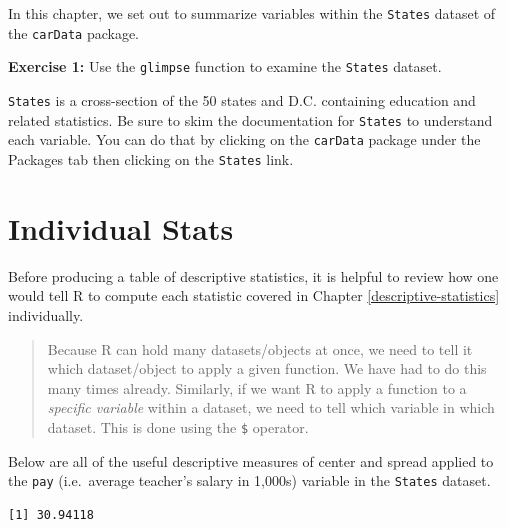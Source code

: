 \documentclass[
]{book}
\makeatletter
\newenvironment{Shaded}{\begin{snugshade}}{\end{snugshade}}
\newcommand{\FunctionTok}[1]{\textcolor[rgb]{0,0,0}{#1}}
\newcommand{\NormalTok}[1]{#1}
\newcommand{\SpecialCharTok}[1]{\textcolor[rgb]{0,0,0}{#1}}
\newenvironment{kframe}{%
\medskip{}
\setlength{\fboxsep}{.8em}
 \def\at@end@of@kframe{}%
 \ifinner\ifhmode%
  \def\at@end@of@kframe{\end{minipage}}%
  \begin{minipage}{\columnwidth}%
 \fi\fi%
 \def\FrameCommand##1{\hskip\@totalleftmargin \hskip-\fboxsep
 \colorbox{shadecolor}{##1}\hskip-\fboxsep
     \hskip-\linewidth \hskip-\@totalleftmargin \hskip\columnwidth}%
 \MakeFramed {\advance\hsize-\width
   \@totalleftmargin\z@ \linewidth\hsize
   \@setminipage}}%
 {\par\unskip\endMakeFramed%
 \at@end@of@kframe}
\renewenvironment{Shaded}{\begin{kframe}}{\end{kframe}}
\newenvironment{rmdblock}[1]
  {\begin{shaded*}
  }
  {\end{shaded*}
  }
\newenvironment{learncheck}
  {\begin{rmdblock}{warning}}
  {\end{rmdblock}}
\makeatother
\begin{document}
In this chapter, we set out to summarize variables within the \texttt{States} dataset of the \texttt{carData} package.

\begin{learncheck}
\textbf{Exercise 1:} Use the \texttt{glimpse} function to examine the
\texttt{States} dataset.
\end{learncheck}

\texttt{States} is a cross-section of the 50 states and D.C. containing education and related statistics. Be sure to skim the documentation for \texttt{States} to understand each variable. You can do that by clicking on the \texttt{carData} package under the Packages tab then clicking on the \texttt{States} link.

\hypertarget{individual-stats}{%
\section{Individual Stats}\label{individual-stats}}

Before producing a table of descriptive statistics, it is helpful to review how one would tell R to compute each statistic covered in Chapter \ref{descriptive-statistics} individually.

\begin{quote}
Because R can hold many datasets/objects at once, we need to tell it which dataset/object to apply a given function. We have had to do this many times already. Similarly, if we want R to apply a function to a \emph{specific variable} within a dataset, we need to tell which variable in which dataset. This is done using the \texttt{\$} operator.
\end{quote}

Below are all of the useful descriptive measures of center and spread applied to the \texttt{pay} (i.e.~average teacher's salary in 1,000s) variable in the \texttt{States} dataset.

\begin{Shaded}
\end{Shaded}

\begin{verbatim}
[1] 30.94118
\end{verbatim}

\begin{Shaded}
\end{Shaded}
\end{document}
